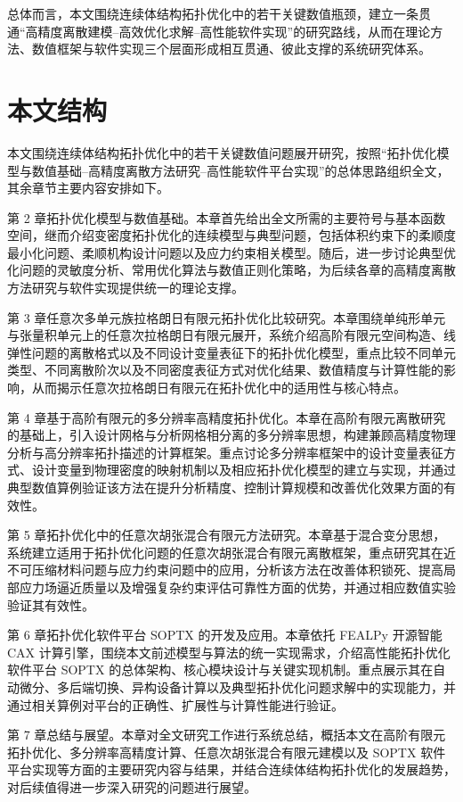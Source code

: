 总体而言，本文围绕连续体结构拓扑优化中的若干关键数值瓶颈，建立一条贯通“高精度离散建模--高效优化求解--高性能软件实现”的研究路线，从而在理论方法、数值框架与软件实现三个层面形成相互贯通、彼此支撑的系统研究体系。


\section{本文结构}
\label{sec:thesis_structure}

本文围绕连续体结构拓扑优化中的若干关键数值问题展开研究，按照“拓扑优化模型与数值基础--高精度离散方法研究--高性能软件平台实现”的总体思路组织全文，其余章节主要内容安排如下。

第 2 章拓扑优化模型与数值基础。本章首先给出全文所需的主要符号与基本函数空间，继而介绍变密度拓扑优化的连续模型与典型问题，包括体积约束下的柔顺度最小化问题、柔顺机构设计问题以及应力约束相关模型。随后，进一步讨论典型优化问题的灵敏度分析、常用优化算法与数值正则化策略，为后续各章的高精度离散方法研究与软件实现提供统一的理论支撑。

第 3 章任意次多单元族拉格朗日有限元拓扑优化比较研究。本章围绕单纯形单元与张量积单元上的任意次拉格朗日有限元展开，系统介绍高阶有限元空间构造、线弹性问题的离散格式以及不同设计变量表征下的拓扑优化模型，重点比较不同单元类型、不同离散阶次以及不同密度表征方式对优化结果、数值精度与计算性能的影响，从而揭示任意次拉格朗日有限元在拓扑优化中的适用性与核心特点。

第 4 章基于高阶有限元的多分辨率高精度拓扑优化。本章在高阶有限元离散研究的基础上，引入设计网格与分析网格相分离的多分辨率思想，构建兼顾高精度物理分析与高分辨率拓扑描述的计算框架。重点讨论多分辨率框架中的设计变量表征方式、设计变量到物理密度的映射机制以及相应拓扑优化模型的建立与实现，并通过典型数值算例验证该方法在提升分析精度、控制计算规模和改善优化效果方面的有效性。

第 5 章拓扑优化中的任意次胡张混合有限元方法研究。本章基于混合变分思想，系统建立适用于拓扑优化问题的任意次胡张混合有限元离散框架，重点研究其在近不可压缩材料问题与应力约束问题中的应用，分析该方法在改善体积锁死、提高局部应力场逼近质量以及增强复杂约束评估可靠性方面的优势，并通过相应数值实验验证其有效性。

第 6 章拓扑优化软件平台 SOPTX 的开发及应用。本章依托 FEALPy 开源智能 CAX 计算引擎，围绕本文前述模型与算法的统一实现需求，介绍高性能拓扑优化软件平台 SOPTX 的总体架构、核心模块设计与关键实现机制。重点展示其在自动微分、多后端切换、异构设备计算以及典型拓扑优化问题求解中的实现能力，并通过相关算例对平台的正确性、扩展性与计算性能进行验证。

第 7 章总结与展望。本章对全文研究工作进行系统总结，概括本文在高阶有限元拓扑优化、多分辨率高精度计算、任意次胡张混合有限元建模以及 SOPTX 软件平台实现等方面的主要研究内容与结果，并结合连续体结构拓扑优化的发展趋势，对后续值得进一步深入研究的问题进行展望。


\fi